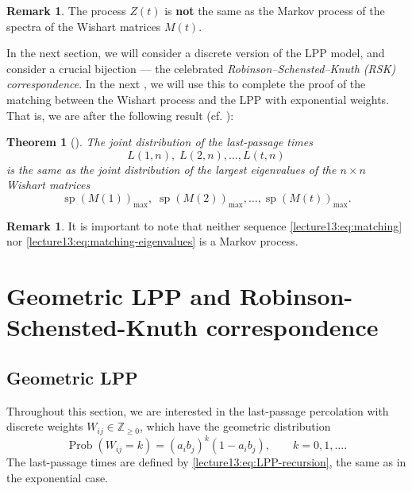\documentclass[letterpaper,11pt,oneside,reqno]{book}
\numberwithin{equation}{chapter}  %
\newtheorem{theorem}[proposition]{Theorem}
\theoremstyle{definition}
\newtheorem{remark}[proposition]{Remark}
\begin{document}
\begin{remark}
	\label{lecture13:rem:Z_not_Markov}
	The process $Z(t)$ is \textbf{not} the same as the
	Markov process of the spectra of the Wishart matrices
	$M(t)$.
\end{remark}

In the next section, we will consider a discrete version of the
LPP model, and consider a crucial bijection --- the celebrated
\emph{Robinson--Schensted--Knuth (RSK) correspondence}.
In the next , we will
use this to complete the proof of the matching between the
Wishart process and the LPP with exponential weights.
That is, we are after the following result (cf. ):
\begin{theorem}[\cite{dieker2008largest}]
	\label{lecture13:thm:matching}
	The joint distribution of the last-passage times
	\begin{equation}
		\label{lecture13:eq:matching}
		L(1,n),\;L(2,n),\ldots,L(t,n)
	\end{equation}
	is the same as the joint distribution of the largest
	eigenvalues
	of the $n\times n$ Wishart matrices
	\begin{equation}
		\label{lecture13:eq:matching-eigenvalues}
		\operatorname{sp}(M(1))_{\max},\;\operatorname{sp}(M(2))_{\max},\ldots,\operatorname{sp}(M(t))_{\max}.
	\end{equation}
\end{theorem}

\begin{remark}
    It is important to note
		that
		neither sequence
		\eqref{lecture13:eq:matching} nor \eqref{lecture13:eq:matching-eigenvalues}
		is a Markov process.
\end{remark}


\section{Geometric LPP and Robinson-Schensted-Knuth correspondence}

\subsection{Geometric LPP}

Throughout this section, we are interested in the
last-passage percolation with discrete weights $W_{ij}\in \mathbb{Z}_{\ge0}$,
which have the geometric distribution
\begin{equation}
	\label{lecture13:eq:geometric}
	\operatorname{Prob}(W_{ij}=k) = (a_i b_j)^{k}(1 - a_ib_j),
    \qquad k=0,1,\ldots.
\end{equation}
The last-passage times are defined by \eqref{lecture13:eq:LPP-recursion},
the same as in the exponential case.
\end{document}
